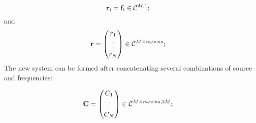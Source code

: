 \documentclass[10pt]{article}
\begin{document}
\[
 {\bf r_i} = {\bf f_i} \in \mathcal{C}^{M,1};
\]and
\[

{\bf r} = 
 \begin{pmatrix}
  r_1     \\
  \vdots  \\
  r_N    
 \end{pmatrix} \in \mathcal{C}^{M\times n\omega \times ns};

\]
The new system can be formed after concatenating several combinations of source and frequencies:

\[
{\bf C } = 
 \begin{pmatrix}
  C_1     \\
  \vdots  \\
  C_N    
 \end{pmatrix} \in \mathcal{C}^{M\times n\omega \times ns, 2M};
\]
\end{document}
